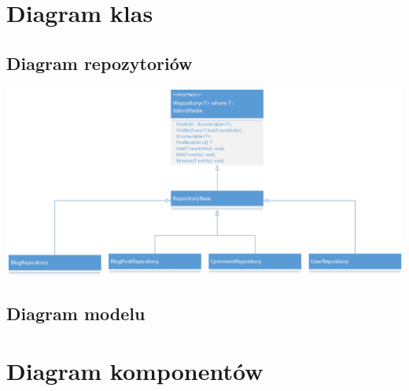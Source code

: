 \documentclass{article}
\begin{document}
\section{Diagram klas}
\subsection{Diagram repozytoriów}
\includegraphics[width=\textwidth]{RepositoryClassDiagram}
\subsection{Diagram modelu}
\section{Diagram komponentów}
\end{document}
